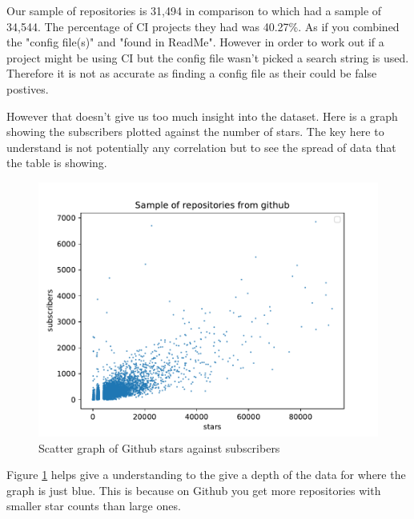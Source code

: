\documentclass[twoside,12pt,titlepage,a4paper]{article}
\begin{document}
Our sample of repositories is 31,494 in comparison to \cite{Hilton2016} which had a sample of 34,544. The percentage of CI projects they had was 40.27\%. As if you combined the "config file(s)" and "found in ReadMe". However in order to work out if a project might be using CI but the config file wasn't picked a search string is used. Therefore it is not as accurate as finding a config file as their could be false postives.

However that doesn't give us too much insight into the dataset. Here is a graph showing the subscribers plotted against the number of stars. The key here to understand is not potentially any correlation but to see the spread of data that the table is showing. 

\begin{figure}[h]
  \centering
  \includegraphics[width=\textwidth]{../src/results/sub vs stars.pdf}
  \caption[alt text]{Scatter graph of Github stars against subscribers}
  \label{graph_scatter_stars_vs_subs}
\end{figure}

Figure \ref{graph_scatter_stars_vs_subs} helps give a understanding to the give a depth of the data for where the graph is just blue. This is because on Github you get more repositories with smaller star counts than large ones.
\end{document}
